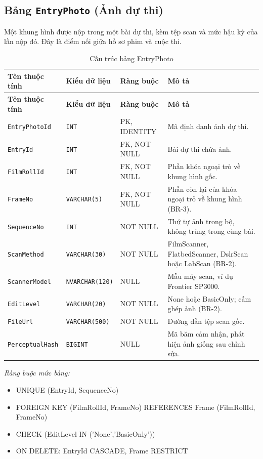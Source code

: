 \subsection{Bảng \texttt{EntryPhoto} (Ảnh dự thi)}

Một khung hình được nộp trong một bài dự thi, kèm tệp scan và mức hậu kỳ của lần nộp đó. Đây là điểm nối giữa hồ sơ phim và cuộc thi.

\begin{longtable}{|L{4cm}|L{3.15cm}|L{2.4cm}|L{4.55cm}|}
\caption{Cấu trúc bảng EntryPhoto} \\
\hline
\textbf{Tên thuộc tính} & \textbf{Kiểu dữ liệu} & \textbf{Ràng buộc} & \textbf{Mô tả} \\ \hline
\endfirsthead
\hline
\textbf{Tên thuộc tính} & \textbf{Kiểu dữ liệu} & \textbf{Ràng buộc} & \textbf{Mô tả} \\ \hline
\endhead
\texttt{EntryPhotoId} & \texttt{INT} & PK, IDENTITY & Mã định danh ảnh dự thi. \\ \hline
\texttt{EntryId} & \texttt{INT} & FK, NOT NULL & Bài dự thi chứa ảnh. \\ \hline
\texttt{FilmRollId} & \texttt{INT} & FK, NOT NULL & Phần khóa ngoại trỏ về khung hình gốc. \\ \hline
\texttt{FrameNo} & \texttt{VARCHAR(5)} & FK, NOT NULL & Phần còn lại của khóa ngoại trỏ về khung hình (BR-3). \\ \hline
\texttt{SequenceNo} & \texttt{INT} & NOT NULL & Thứ tự ảnh trong bộ, không trùng trong cùng bài. \\ \hline
\texttt{ScanMethod} & \texttt{VARCHAR(30)} & NOT NULL & FilmScanner, FlatbedScanner, DslrScan hoặc LabScan (BR-2). \\ \hline
\texttt{ScannerModel} & \texttt{NVARCHAR(120)} & NULL & Mẫu máy scan, ví dụ Frontier SP3000. \\ \hline
\texttt{EditLevel} & \texttt{VARCHAR(20)} & NOT NULL & None hoặc BasicOnly; cấm ghép ảnh (BR-2). \\ \hline
\texttt{FileUrl} & \texttt{VARCHAR(500)} & NOT NULL & Đường dẫn tệp scan gốc. \\ \hline
\texttt{PerceptualHash} & \texttt{BIGINT} & NULL & Mã băm cảm nhận, phát hiện ảnh giống sau chỉnh sửa. \\ \hline
\end{longtable}

\noindent\textit{Ràng buộc mức bảng:}

\begin{itemize}\raggedright
    \item UNIQUE (EntryId,\allowbreak{} SequenceNo)
    \item FOREIGN KEY (FilmRollId,\allowbreak{} FrameNo) REFERENCES Frame (FilmRollId,\allowbreak{} FrameNo)
    \item CHECK (EditLevel IN ('None',\allowbreak{}'BasicOnly'))
    \item ON DELETE: EntryId CASCADE,\allowbreak{} Frame RESTRICT
\end{itemize}

